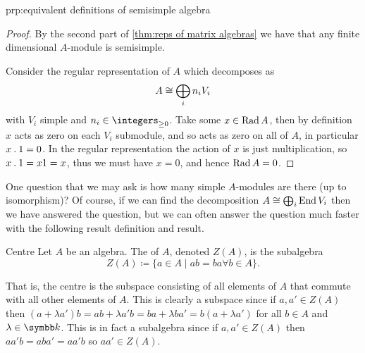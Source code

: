 \begin{prp}{}{prp:equivalent definitions of semisimple algebra}
\begin{proof}
        By the second part of \cref{thm:reps of matrix algebras} we have that any finite dimensional \(A\)-module is semisimple.
        
        Consider the regular representation of \(A\) which decomposes as
        \begin{equation}
            A \cong \bigoplus_i n_i V_i
        \end{equation}
        with \(V_i\) simple and \(n_i \in \integers_{\ge 0}\).
        Take some \(x \in \operatorname{Rad} A\), then by definition \(x\) acts as zero on each \(V_i\) submodule, and so acts as zero on all of \(A\), in particular \(x \mathbin{.} 1 = 0\).
        In the regular representation the action of \(x\) is just multiplication, so \(x \mathbin{.} 1 = x1 = x\), thus we must have \(x = 0\), and hence \(\operatorname{Rad} A = 0\).
    \end{proof}
\end{prp}

One question that we may ask is how many simple \(A\)-modules are there (up to isomorphism)?
Of course, if we can find the decomposition \(A \cong \bigoplus_i \operatorname{End} V_i\) then we have answered the question, but we can often answer the question much faster with the following result definition and result.

\begin{dfn}{Centre}{}
    Let \(A\) be an algebra.
    The  of \(A\), denoted \(Z(A)\), is the subalgebra
    \begin{equation}
        Z(A) \coloneqq \{a \in A \mid ab = ba \forall b \in A\}.
    \end{equation}
\end{dfn}

That is, the centre is the subspace consisting of all elements of \(A\) that commute with all other elements of \(A\).
This is clearly a subspace since if \(a, a' \in Z(A)\) then \((a + \lambda a')b = ab + \lambda a'b = ba + \lambda ba' = b(a + \lambda a')\) for all \(b \in A\) and \(\lambda \in \field\).
This is in fact a subalgebra since if \(a, a' \in Z(A)\) then \(aa'b = aba' = aa'b\) so \(aa' \in Z(A)\).

